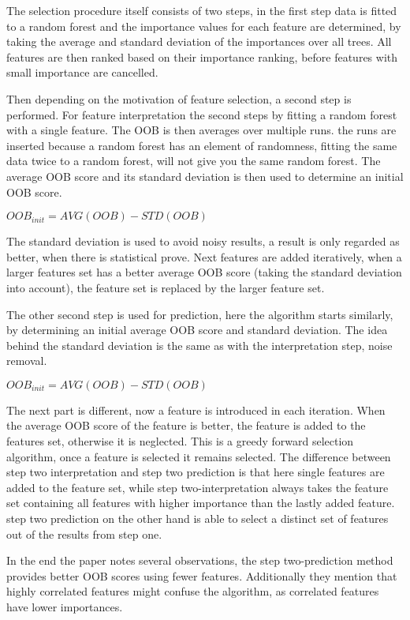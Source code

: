 \npar

The selection procedure itself consists of two steps, in the first step data is fitted to a random forest and the importance values for each feature are determined, by taking the average and standard deviation of the importances over all trees. All features are then ranked based on their importance ranking, before features with small importance are cancelled. 

\npar

Then depending on the motivation of feature selection, a second step is performed. For feature interpretation the second steps by fitting a random forest with a single feature. The OOB is then averages over multiple runs. the runs are inserted because a random forest has an element of randomness, fitting the same data twice to a random forest, will not give you the same random forest. The average OOB score and its standard deviation is then used to determine an initial OOB score.
\begin{center}
$OOB_{init} = AVG(OOB) - STD(OOB)$
\end{center}
The standard deviation is used to avoid noisy results, a result is only regarded as better, when there is statistical prove. Next features are added iteratively, when a larger features set has a better average OOB score (taking the standard deviation into account), the feature set is replaced by the larger feature set.

\npar

The other second step is used for prediction, here the algorithm starts similarly, by determining an initial average OOB score and standard deviation. The idea behind the standard deviation is the same as with the interpretation step, noise removal.
\begin{center}
$OOB_{init} = AVG(OOB) - STD(OOB)$
\end{center}
The next part is different, now a feature is introduced in each iteration. When the average OOB score of the feature is better, the feature is added to the features set, otherwise it is neglected. This is a greedy forward selection algorithm, once a feature is selected it remains selected. The difference between step two interpretation and step two prediction is that here single features are added to the feature set, while step two-interpretation always takes the feature set containing all features with higher importance than the lastly added feature. step two prediction on the other hand is able to select a distinct set of features out of the results from step one.

\npar
In the end the paper notes several observations, the step two-prediction method provides better OOB scores using fewer features. Additionally they mention that highly correlated features might confuse the algorithm, as correlated features have lower importances.